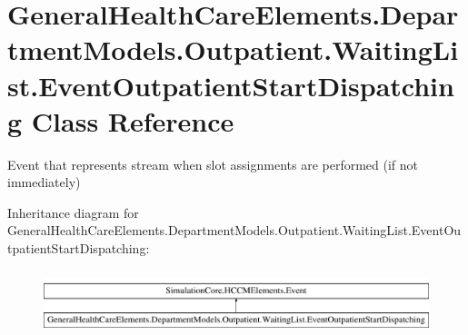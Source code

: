 \hypertarget{class_general_health_care_elements_1_1_department_models_1_1_outpatient_1_1_waiting_list_1_1_event_outpatient_start_dispatching}{}\section{General\+Health\+Care\+Elements.\+Department\+Models.\+Outpatient.\+Waiting\+List.\+Event\+Outpatient\+Start\+Dispatching Class Reference}
\label{class_general_health_care_elements_1_1_department_models_1_1_outpatient_1_1_waiting_list_1_1_event_outpatient_start_dispatching}


Event that represents stream when slot assignments are performed (if not immediately)  


Inheritance diagram for General\+Health\+Care\+Elements.\+Department\+Models.\+Outpatient.\+Waiting\+List.\+Event\+Outpatient\+Start\+Dispatching\+:\begin{figure}[H]
\begin{center}
\leavevmode
\includegraphics[height=1.872910cm]{class_general_health_care_elements_1_1_department_models_1_1_outpatient_1_1_waiting_list_1_1_event_outpatient_start_dispatching}
\end{center}
\end{figure}
